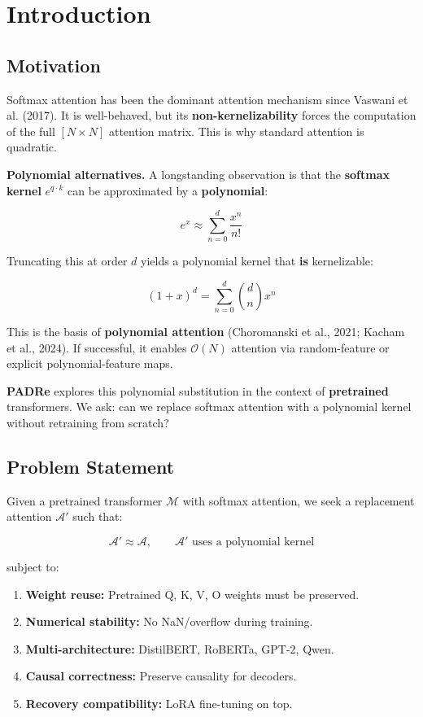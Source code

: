\section{Introduction}

\subsection{Motivation}

Softmax attention has been the dominant attention mechanism since 
Vaswani et al. (2017). It is well-behaved, but its \textbf{non-kernelizability} 
forces the computation of the full $[N \times N]$ attention matrix. This 
is why standard attention is quadratic.

\textbf{Polynomial alternatives.} A longstanding observation is that the 
\textbf{softmax kernel} $e^{q \cdot k}$ can be approximated by a \textbf{polynomial}:

\[
e^x \approx \sum_{n=0}^{d} \frac{x^n}{n!}
\tag{1.1}
\]

Truncating this at order $d$ yields a polynomial kernel that \textbf{is} 
kernelizable:

\[
(1 + x)^d = \sum_{n=0}^{d} \binom{d}{n} x^n
\tag{1.2}
\]

This is the basis of \textbf{polynomial attention} (Choromanski et al., 2021; 
Kacham et al., 2024). If successful, it enables $\mathcal{O}(N)$ attention 
via random-feature or explicit polynomial-feature maps.

\textbf{PADRe} explores this polynomial substitution in the context of \textbf{pretrained} 
transformers. We ask: can we replace softmax attention with a polynomial 
kernel without retraining from scratch?

\subsection{Problem Statement}

Given a pretrained transformer $\mathcal{M}$ with softmax attention, we 
seek a replacement attention $\mathcal{A}'$ such that:

\[
\mathcal{A}' \approx \mathcal{A}, \qquad
\mathcal{A}' \text{ uses a polynomial kernel}
\tag{1.3}
\]

subject to:

\begin{enumerate}
\item \textbf{Weight reuse:} Pretrained Q, K, V, O weights must be preserved.
\item \textbf{Numerical stability:} No NaN/overflow during training.
\item \textbf{Multi-architecture:} DistilBERT, RoBERTa, GPT-2, Qwen.
\item \textbf{Causal correctness:} Preserve causality for decoders.
\item \textbf{Recovery compatibility:} LoRA fine-tuning on top.

\end{enumerate}
